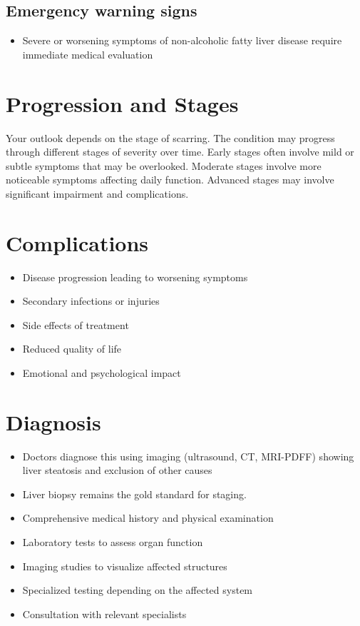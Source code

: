 \subsection{Emergency warning signs}
\begin{itemize}[noitemsep]
  \item Severe or worsening symptoms of non-alcoholic fatty liver disease require immediate medical evaluation
\end{itemize}
\section{Progression and Stages}
Your outlook depends on the stage of scarring. The condition may progress through different stages of severity over time. Early stages often involve mild or subtle symptoms that may be overlooked. Moderate stages involve more noticeable symptoms affecting daily function. Advanced stages may involve significant impairment and complications.
\section{Complications}
\begin{itemize}[noitemsep]
  \item Disease progression leading to worsening symptoms
  \item Secondary infections or injuries
  \item Side effects of treatment
  \item Reduced quality of life
  \item Emotional and psychological impact
\end{itemize}
\section{Diagnosis}
\begin{itemize}[noitemsep]
  \item Doctors diagnose this using imaging (ultrasound, CT, MRI-PDFF) showing liver steatosis and exclusion of other causes
  \item Liver biopsy remains the gold standard for staging.
  \item Comprehensive medical history and physical examination
  \item Laboratory tests to assess organ function
  \item Imaging studies to visualize affected structures
  \item Specialized testing depending on the affected system
  \item Consultation with relevant specialists
\end{itemize}
